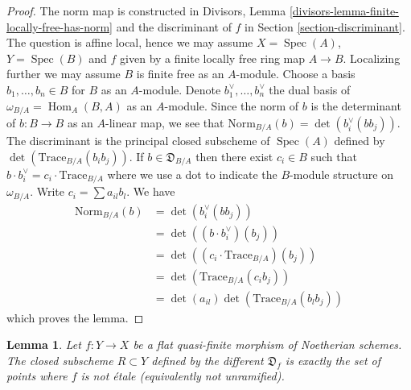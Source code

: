 \documentclass{stacks-project}
\theoremstyle{plain}
\newtheorem{lemma}[subsection]{Lemma}
\theoremstyle{definition}
\theoremstyle{remark}
\numberwithin{equation}{subsection}
\def\Spec{\mathop{\mathrm{Spec}}}
\def\Hom{\mathop{\mathrm{Hom}}\nolimits}
\begin{document}
\begin{proof}
The norm map is constructed in
Divisors, Lemma \ref{divisors-lemma-finite-locally-free-has-norm}
and the discriminant of $f$ in Section \ref{section-discriminant}.
The question is affine local, hence we may assume $X = \Spec(A)$,
$Y = \Spec(B)$ and $f$ given by a finite locally free ring map $A \to B$.
Localizing further we may assume $B$ is finite free as an $A$-module.
Choose a basis $b_1, \ldots, b_n \in B$ for $B$ as an $A$-module.
Denote $b_1^\vee, \ldots, b_n^\vee$ the dual basis of
$\omega_{B/A} = \Hom_A(B, A)$ as an $A$-module.
Since the norm of $b$ is the determinant of $b : B \to B$ as an
$A$-linear map, we see that
$\text{Norm}_{B/A}(b) = \det(b_i^\vee(bb_j))$.
The discriminant is the principal closed subscheme of $\Spec(A)$
defined by $\det(\text{Trace}_{B/A}(b_ib_j))$.
If $b \in \mathfrak{D}_{B/A}$ then
there exist $c_i \in B$ such that
$b \cdot b_i^\vee = c_i \cdot \text{Trace}_{B/A}$ where
we use a dot to indicate the $B$-module structure on $\omega_{B/A}$.
Write $c_i = \sum a_{il} b_l$.
We have
\begin{align*}
\text{Norm}_{B/A}(b)
& =
\det(b_i^\vee(bb_j)) \\
& =
\det( (b \cdot b_i^\vee)(b_j)) \\
& =
\det((c_i \cdot \text{Trace}_{B/A})(b_j)) \\
& =
\det(\text{Trace}_{B/A}(c_ib_j)) \\
& =
\det(a_{il}) \det(\text{Trace}_{B/A}(b_l b_j))
\end{align*}
which proves the lemma.
\end{proof}

\begin{lemma}
\label{lemma-different-ramification}
Let $f : Y \to X$ be a flat quasi-finite morphism of Noetherian schemes.
The closed subscheme $R \subset Y$ defined by the different $\mathfrak{D}_f$
is exactly the set of points where $f$ is not \'etale
(equivalently not unramified).
\end{lemma}
\end{document}
